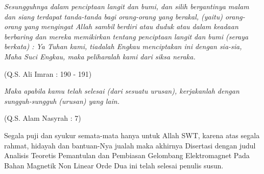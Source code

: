 \documentclass[disertasi]{ugmdisertasi}
\begin{document}
\cover

\titlepageind 

\approvalpage

\declarepage

\acknowledment
\begin{flushright}
\Large\emph{}
\end{flushright}

\motto
\emph{Sesungguhnya dalam penciptaan langit dan bumi, dan silih bergantinya
malam dan siang terdapat tanda-tanda bagi orang-orang yang berakal, (yaitu)
orang-orang yang mengingat Allah sambil berdiri atau duduk atau dalam keadaan
berbaring dan mereka memikirkan tentang penciptaan langit dan bumi (seraya
berkata) : Ya Tuhan kami, tiadalah Engkau menciptakan ini dengan sia-sia, Maha
Suci Engkau, maka peliharalah kami dari siksa neraka.}

\begin{flushright}
(Q.S. Ali Imran : 190 - 191)
\end{flushright}

\emph{Maka apabila kamu telah selesai (dari sesuatu urusan), kerjakanlah
dengan sungguh-sungguh (urusan) yang lain.}

\begin{flushright}
(Q.S. Alam Nasyrah : 7)
\end{flushright}

\preface
Segala puji dan syukur semata-mata hanya untuk Allah SWT, karena atas segala
rahmat, hidayah dan bantuan-Nya jualah maka akhirnya Disertasi dengan judul
Analisis Teoretis Pemantulan dan Pembiasan Gelombang Elektromagnet Pada
Bahan Magnetik Non Linear Orde Dua ini telah selesai penulis susun.
\end{document}
